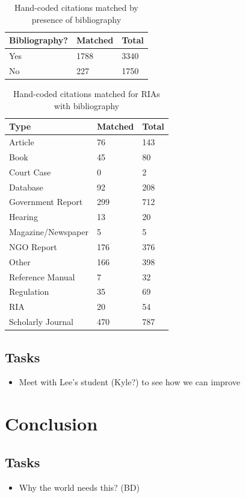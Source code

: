 \documentclass[12pt]{article}
\begin{document}
\begin{table}[ht]
\centering
\caption{Hand-coded citations matched by presence of bibliography}\label{tab:bibmatch}
\begin{tabular}{lll}
  \hline
  \hline
 Bibliography? & Matched & Total\\
 \hline
 Yes & 1788 & 3340\\
 No & 227 & 1750\\
  \hline
  \hline
\end{tabular}
\end{table}

\begin{table}[ht]
\centering
\caption{Hand-coded citations matched for RIAs with bibliography}\label{tab:bibtypes}
\begin{tabular}{lll}
  \hline
  \hline
 Type & Matched & Total\\
 \hline
Article & 76 & 143 \\
Book & 45 & 80\\
Court Case & 0 & 2\\
Database & 92 & 208 \\
Government Report & 299 & 712 \\
Hearing & 13 & 20\\
Magazine/Newspaper & 5 & 5\\
NGO Report & 176 & 376 \\
Other & 166 & 398 \\
Reference Manual & 7 &  32\\
Regulation & 35 & 69 \\
RIA & 20 & 54\\
Scholarly Journal & 470 & 787\\
  \hline
  \hline
\end{tabular}
\end{table}

\subsection{Tasks}

\begin{itemize}
\item Meet with Lee's student (Kyle?) to see how we can improve
\end{itemize}


\section{Conclusion}

\subsection{Tasks}

\begin{itemize}
\item Why the world needs this? (BD)
\end{itemize}


\clearpage
\singlespace

\nocite{*}

\clearpage
\end{document}
